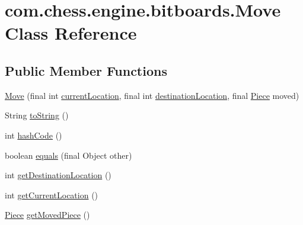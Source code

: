 \hypertarget{classcom_1_1chess_1_1engine_1_1bitboards_1_1_move}{}\section{com.\+chess.\+engine.\+bitboards.\+Move Class Reference}
\label{classcom_1_1chess_1_1engine_1_1bitboards_1_1_move}
\subsection*{Public Member Functions}
\begin{DoxyCompactItemize}
\item 
\mbox{\hyperlink{classcom_1_1chess_1_1engine_1_1bitboards_1_1_move_ae887a943428294c964d6ecfd33a7eb62}{Move}} (final int \mbox{\hyperlink{classcom_1_1chess_1_1engine_1_1bitboards_1_1_move_a21d50223c83db07c62fca6fa70623ed1}{current\+Location}}, final int \mbox{\hyperlink{classcom_1_1chess_1_1engine_1_1bitboards_1_1_move_ae9432b9156a87e04f3417ba1da2cc7a7}{destination\+Location}}, final \mbox{\hyperlink{enumcom_1_1chess_1_1engine_1_1bitboards_1_1_bit_board_1_1_piece}{Piece}} moved)
\item 
String \mbox{\hyperlink{classcom_1_1chess_1_1engine_1_1bitboards_1_1_move_a6b5badd24f744be0d8cb7fd993e39756}{to\+String}} ()
\item 
int \mbox{\hyperlink{classcom_1_1chess_1_1engine_1_1bitboards_1_1_move_acfc415d910b6064b268be9d80748bfe5}{hash\+Code}} ()
\item 
boolean \mbox{\hyperlink{classcom_1_1chess_1_1engine_1_1bitboards_1_1_move_afafd49d74e425e6f2f15b25b37fb2f9e}{equals}} (final Object other)
\item 
int \mbox{\hyperlink{classcom_1_1chess_1_1engine_1_1bitboards_1_1_move_ae0c0c9631b9e3b67200834eaac0c7390}{get\+Destination\+Location}} ()
\item 
int \mbox{\hyperlink{classcom_1_1chess_1_1engine_1_1bitboards_1_1_move_a87c5791dc95e84e0fe271e9f804bf3f0}{get\+Current\+Location}} ()
\item 
\mbox{\hyperlink{enumcom_1_1chess_1_1engine_1_1bitboards_1_1_bit_board_1_1_piece}{Piece}} \mbox{\hyperlink{classcom_1_1chess_1_1engine_1_1bitboards_1_1_move_a427a37b0bbffc20e11e41df33ad71775}{get\+Moved\+Piece}} ()
\end{DoxyCompactItemize}
